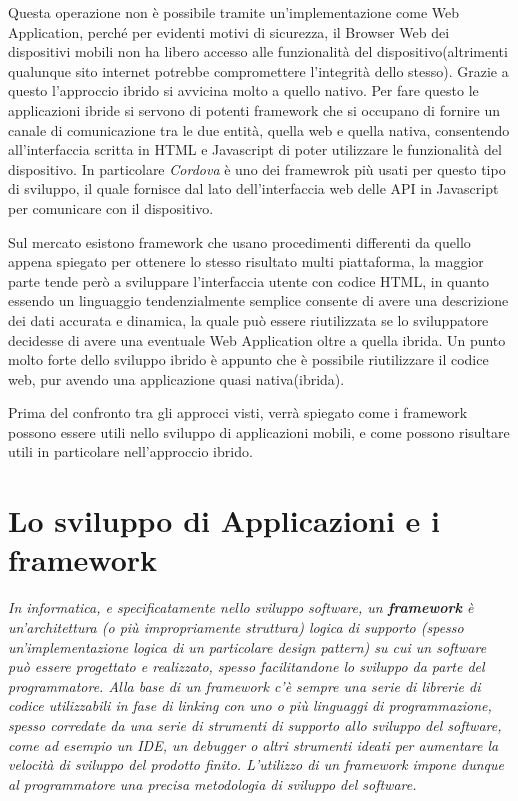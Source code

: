 Questa operazione non è possibile tramite un'implementazione come Web Application, perché per evidenti motivi di sicurezza, il Browser Web dei dispositivi mobili non ha libero accesso alle funzionalità del dispositivo(altrimenti qualunque sito internet potrebbe compromettere l'integrità dello stesso). Grazie a questo l'approccio ibrido si avvicina molto a quello nativo. Per fare questo le applicazioni ibride si servono di potenti framework che si occupano di fornire un canale di comunicazione tra le due entità, quella web e quella nativa, consentendo all'interfaccia scritta in HTML e Javascript di poter utilizzare le funzionalità del dispositivo. In particolare \emph{Cordova} è uno dei framewrok più usati per questo tipo di sviluppo, il quale fornisce dal lato dell'interfaccia web delle API in Javascript per comunicare con il dispositivo.

Sul mercato esistono framework che usano procedimenti differenti da quello appena spiegato per ottenere lo stesso risultato multi piattaforma, la maggior parte tende però a sviluppare l'interfaccia utente con codice
HTML, in quanto essendo un linguaggio tendenzialmente semplice consente di avere una descrizione dei dati accurata e dinamica, la quale può essere riutilizzata se lo sviluppatore decidesse di avere una eventuale Web Application oltre a quella ibrida. Un punto molto forte dello sviluppo ibrido è appunto che è possibile riutilizzare il codice web, pur avendo una applicazione quasi nativa(ibrida).  

Prima del confronto tra gli approcci visti, verrà spiegato come i framework possono essere utili nello sviluppo di applicazioni mobili, e come possono risultare utili in particolare nell'approccio ibrido.

\section{Lo sviluppo di Applicazioni e i framework}
\label{sec:appAndFramework}
\textit{In informatica, e specificatamente nello sviluppo software, un \textbf{framework} è un'architettura (o più impropriamente struttura) logica di supporto (spesso un'implementazione logica di un particolare design pattern) su cui un software può essere progettato e realizzato, spesso facilitandone lo sviluppo da parte del programmatore. Alla base di un framework c'è sempre una serie di librerie di codice utilizzabili in fase di linking con uno o più linguaggi di programmazione, spesso corredate da una serie di strumenti di supporto allo sviluppo del software, come ad esempio un IDE, un debugger o altri strumenti ideati per aumentare la velocità di sviluppo del prodotto finito. L'utilizzo di un framework impone dunque al programmatore una precisa metodologia di sviluppo del software.}\\
\hspace*{\fill}\cite{wiki:framework}


